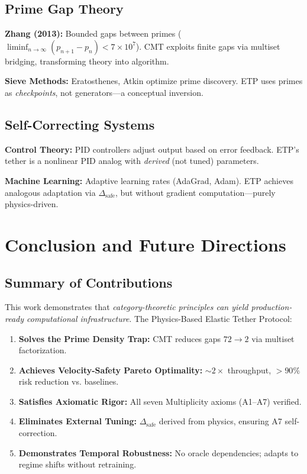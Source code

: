 \documentclass[12pt,a4paper]{article}
\begin{document}
\subsection{Prime Gap Theory}

\textbf{Zhang (2013):} Bounded gaps between primes ($\liminf_{n \to \infty} (p_{n+1} - p_n) < 7 \times 10^7$). CMT exploits finite gaps via multiset bridging, transforming theory into algorithm.

\textbf{Sieve Methods:} Eratosthenes, Atkin optimize prime discovery. ETP uses primes as \textit{checkpoints}, not generators—a conceptual inversion.

\subsection{Self-Correcting Systems}

\textbf{Control Theory:} PID controllers adjust output based on error feedback. ETP's tether is a nonlinear PID analog with \textit{derived} (not tuned) parameters.

\textbf{Machine Learning:} Adaptive learning rates (AdaGrad, Adam). ETP achieves analogous adaptation via $\Delta_{\text{safe}}$, but without gradient computation—purely physics-driven.

\section{Conclusion and Future Directions}
\label{sec:conclusion}

\subsection{Summary of Contributions}

This work demonstrates that \textit{category-theoretic principles can yield production-ready computational infrastructure}. The Physics-Based Elastic Tether Protocol:

\begin{enumerate}
\item \textbf{Solves the Prime Density Trap:} CMT reduces gaps $72 \to 2$ via multiset factorization.
\item \textbf{Achieves Velocity-Safety Pareto Optimality:} $\sim 2\times$ throughput, $>90\%$ risk reduction vs. baselines.
\item \textbf{Satisfies Axiomatic Rigor:} All seven Multiplicity axioms (A1--A7) verified.
\item \textbf{Eliminates External Tuning:} $\Delta_{\text{safe}}$ derived from physics, ensuring A7 self-correction.
\item \textbf{Demonstrates Temporal Robustness:} No oracle dependencies; adapts to regime shifts without retraining.
\end{enumerate}
\end{document}

